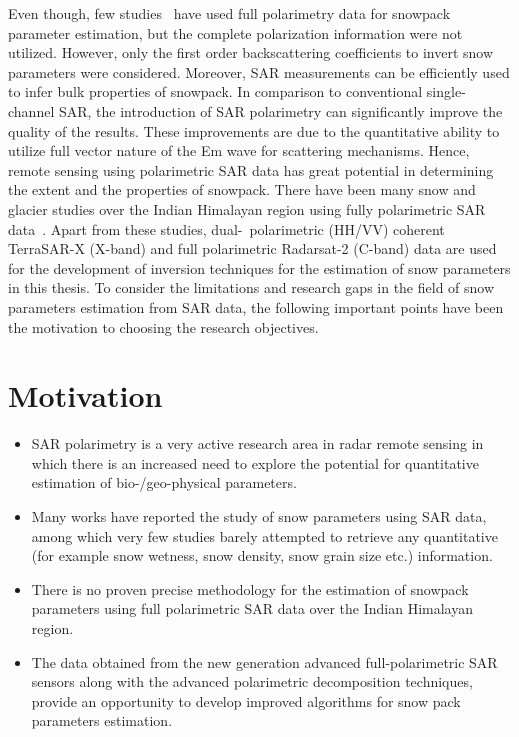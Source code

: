 Even though, few studies~\citep{Shi95wetness,shi2000depth,Shi2000} have used full polarimetry data for snowpack parameter estimation, but the complete polarization information were not utilized. However, only the first order backscattering coefficients to invert snow parameters were considered. Moreover, SAR measurements can be efficiently used to infer bulk properties of snowpack. In comparison to conventional single-channel SAR, the introduction of SAR polarimetry can significantly improve the quality of the results. These improvements are due to the quantitative ability to utilize full vector nature of the Em wave for scattering mechanisms. Hence, remote sensing using polarimetric SAR data has great potential in determining the extent and the properties of snowpack. There have been many snow and glacier studies over the Indian Himalayan region using fully polarimetric SAR data~\citep{singh2011a,singh2012a,singh2012b,singh2014a,singh2014b}. Apart from these studies, dual-~polarimetric (HH/VV) coherent TerraSAR-X (X-band) and full polarimetric Radarsat-2 (C-band)  data are used for the development of inversion techniques for the estimation of snow parameters in this thesis. To consider the limitations and research gaps in the field of snow parameters estimation from SAR data, the following important points have been the motivation to choosing the research objectives.

\section{Motivation}
\begin{itemize}
	\item SAR polarimetry is a very active research area in radar remote sensing in which there is an increased need to explore the potential for quantitative estimation of bio-/geo-physical parameters.
	
	\item Many works have reported the study of snow parameters using SAR data, among which very few studies barely attempted to retrieve any quantitative (for example snow wetness, snow density, snow grain size etc.) information.
	
	\item There is no proven precise methodology for the estimation of snowpack parameters using full polarimetric SAR data over the Indian Himalayan region. 
	
	\item The data obtained from the new generation advanced full-polarimetric SAR sensors along with the advanced polarimetric decomposition techniques, provide an opportunity to develop improved algorithms for snow pack parameters estimation. 
	
\end{itemize}
